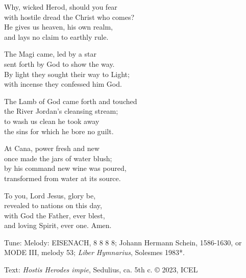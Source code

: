 \hymn

\settowidth{\versewidth}{with hostile dread the Christ who comes?}

\begin{hymnverse}%
Why, wicked Herod, should you fear\\
with hostile dread the Christ who comes?\\
He gives us heaven, his own realm,\\
and lays no claim to earthly rule.

The Magi came, led by a star\\
sent forth by God to show the way.\\
By light they sought their way to Light;\\
with incense they confessed him God.

The Lamb of God came forth and touched\\
the River Jordan’s cleansing stream;\\
to wash us clean he took away\\
the sins for which he bore no guilt.

At Cana, power fresh and new\\
once made the jars of water blush;\\
by his command new wine was poured,\\
transformed from water at its source.

To you, Lord Jesus, glory be,\\
revealed to nations on this day,\\
with God the Father, ever blest,\\
and loving Spirit, ever one. Amen.
\end{hymnverse}

\begin{hymnsource}
Tune: Melody: EISENACH, 8 8 8 8; Johann Hermann Schein, 1586-1630, or MODE III, melody 53; \emph{Liber Hymnarius}, Solesmes 1983*.

Text: \emph{Hostis Herodes impie}, Sedulius, ca. 5th c. © 2023, ICEL
\end{hymnsource}